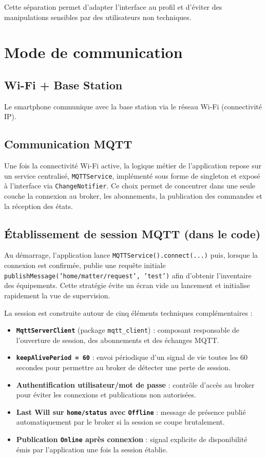 \documentclass[12pt,a4paper]{report}
\begin{document}
Cette séparation permet d’adapter l’interface au profil et d’éviter des manipulations sensibles par des utilisateurs non techniques.

\chapter{Mode de communication}

\section{Wi-Fi + Base Station}
Le smartphone communique avec la base station via le réseau Wi-Fi (connectivité IP).

\section{Communication MQTT}
Une fois la connectivité Wi-Fi active, la logique métier de l’application repose sur un service centralisé, \texttt{MQTTService}, implémenté sous forme de singleton et exposé à l’interface via \texttt{ChangeNotifier}. Ce choix permet de concentrer dans une seule couche la connexion au broker, les abonnements, la publication des commandes et la réception des états.

\section{Établissement de session MQTT (dans le code)}
Au démarrage, l’application lance \texttt{MQTTService().connect(...)} puis, lorsque la connexion est confirmée, publie une requête initiale \texttt{publishMessage('home/matter/request', 'test')} afin d’obtenir l’inventaire des équipements. Cette stratégie évite un écran vide au lancement et initialise rapidement la vue de supervision.

La session est construite autour de cinq éléments techniques complémentaires :
\begin{itemize}[leftmargin=*]
  \item \textbf{\texttt{MqttServerClient}} (package \texttt{mqtt\_client}) : composant responsable de l’ouverture de session, des abonnements et des échanges MQTT.
  \item \textbf{\texttt{keepAlivePeriod = 60}} : envoi périodique d’un signal de vie toutes les 60 secondes pour permettre au broker de détecter une perte de session.
  \item \textbf{Authentification utilisateur/mot de passe} : contrôle d’accès au broker pour éviter les connexions et publications non autorisées.
  \item \textbf{Last Will sur \texttt{home/status} avec \texttt{Offline}} : message de présence publié automatiquement par le broker si la session se coupe brutalement.
  \item \textbf{Publication \texttt{Online} après connexion} : signal explicite de disponibilité émis par l’application une fois la session établie.
\end{itemize}
\end{document}
